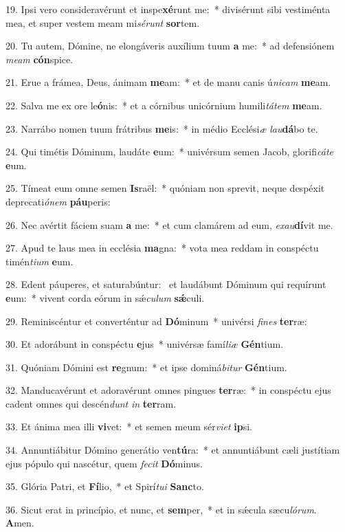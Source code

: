 19. Ipsi vero consideravérunt et inspe\textbf{xé}runt me:~*  divisérunt sibi vestiménta mea, et super vestem meam mi\textit{sé}\textit{runt} \textbf{sor}tem.\

20. Tu autem, Dómine, ne elongáveris auxílium tuum \textbf{a} me:~*  ad defensiónem \textit{me}\textit{am} \textbf{cón}spice.\

21. Erue a frámea, Deus, ánimam \textbf{me}am:~*  et de manu canis ú\textit{ni}\textit{cam} \textbf{me}am.\

22. Salva me ex ore le\textbf{ó}nis:~*  et a córnibus unicórnium humili\textit{tá}\textit{tem} \textbf{me}am.\

23. Narrábo nomen tuum frátribus \textbf{me}is:~*  in médio Ecclési\textit{æ} \textit{lau}\textbf{dá}bo te.\

24. Qui timétis Dóminum, laudáte \textbf{e}um:~*  univérsum semen Jacob, glorifi\textit{cá}\textit{te} \textbf{e}um.\

25. Tímeat eum omne semen \textbf{Is}raël:~*  quóniam non sprevit, neque despéxit deprecati\textit{ó}\textit{nem} \textbf{páu}peris:\

26. Nec avértit fáciem suam \textbf{a} me:~*  et cum clamárem ad eum, \textit{ex}\textit{au}\textbf{dí}vit me.\

27. Apud te laus mea in ecclésia \textbf{ma}gna:~*  vota mea reddam in conspéctu timén\textit{ti}\textit{um} \textbf{e}um.\

28. Edent páuperes, et saturabúntur: \dag\  et laudábunt Dóminum qui requírunt \textbf{e}um:~*  vivent corda eórum in sǽ\textit{cu}\textit{lum} \textbf{sǽ}culi.\

29. Reminiscéntur et converténtur ad \textbf{Dó}minum~*  univérsi \textit{fi}\textit{nes} \textbf{ter}ræ:\

30. Et adorábunt in conspéctu \textbf{e}jus~*  univérsæ famí\textit{li}\textit{æ} \textbf{Gén}tium.\

31. Quóniam Dómini est \textbf{re}gnum:~*  et ipse dominá\textit{bi}\textit{tur} \textbf{Gén}tium.\

32. Manducavérunt et adoravérunt omnes pingues \textbf{ter}ræ:~*  in conspéctu ejus cadent omnes qui descén\textit{dunt} \textit{in} \textbf{ter}ram.\

33. Et ánima mea illi \textbf{vi}vet:~*  et semen meum sér\textit{vi}\textit{et} \textbf{ip}si.\

34. Annuntiábitur Dómino generátio ven\textbf{tú}ra:~*  et annuntiábunt cæli justítiam ejus pópulo qui nascétur, quem \textit{fe}\textit{cit} \textbf{Dó}minus.\

35. Glória Patri, et \textbf{Fí}lio,~*  et Spirí\textit{tu}\textit{i} \textbf{Sanc}to.\

36. Sicut erat in princípio, et nunc, et \textbf{sem}per,~*  et in sǽcula sæcu\textit{ló}\textit{rum}. \textbf{A}men.\

